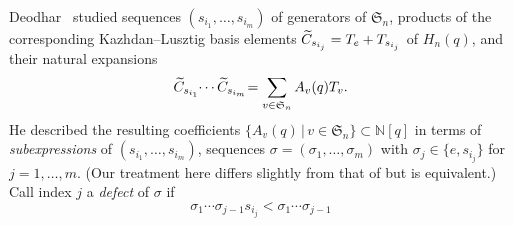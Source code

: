 \documentclass[12pt]{amsart}
\theoremstyle{definition}
\numberwithin{equation}{section}
\newcommand{\sn}{\mathfrak{S}_n}
\newcommand{\hnq}{H_n(q)}
\newcommand{\wtc}[2]{\widetilde{C}_{#1}}
\newcommand{\ntksp}{\negthickspace}
\begin{document}
Deodhar~\cite[Prop.\,3.5]{Deodhar90}
studied sequences
$(s_{i_1},\dotsc,s_{i_m})$
of generators of $\sn$, 
products of the 
corresponding 
Kazhdan--Lusztig basis elements 
$\wtc{\smash{s_{i_j}}}q = T_e + T_{\smash{s_{i_j}}}$ of $\hnq$, 
and their natural expansions
\begin{equation}\label{eq:Deoprod}
\wtc{s_{i_1}\ntksp}q \cdots \wtc{s_{i_m}\ntksp}q
= \sum_{v \in \sn} A_v(q) T_v.
\end{equation}
He 
described 
the 
resulting 
coefficients $\{ A_v(q) \,|\, v \in \sn \} \subset \mathbb N[q]$ 
in terms of {\em subexpressions}
of $(s_{i_1}, \dotsc, s_{i_m})$,
sequences $\sigma = (
\sigma_1, \dotsc, \sigma_m)$ %
with $\sigma_j \in \{ e, s_{i_j}\}$
for $j = 1,\dotsc, m$.
(Our treatment here differs slightly from that of \cite{Deodhar90} but is equivalent.) Call index $j$ a {\em defect} of $\sigma$ if 
\begin{equation}\label{eq:deodhardefect}
\sigma_1 \cdots \sigma_{j-1}s_{i_j} < \sigma_1 \cdots \sigma_{j-1}
\end{equation}
\end{document}
